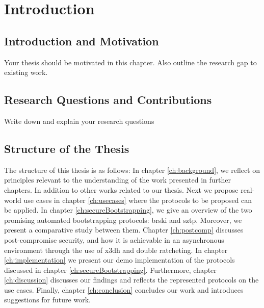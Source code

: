 \chapter{Introduction}
\label{ch:introduction}

% 


\section{Introduction and Motivation}

Your thesis should be motivated in this chapter. Also outline the research gap to existing work. 


\section{Research Questions and Contributions}\label{sec:reserach_questions}

Write down and explain your research questions

\section{Structure of the Thesis}\label{sec:structure_of_the_thesis}

The structure of this thesis is as follows: In chapter \ref{ch:background}, we reflect on principles relevant to the understanding of the work presented in further chapters. In addition to other works related to our thesis. 
Next we propose real-world use cases in chapter \ref{ch:usecases} where the protocols to be proposed can be applied.
In chapter \ref{ch:secureBootstrapping}, we give an overview of the two promising automated bootstrapping protocols: \gls{brski} and \gls{sztp}. Moreover, we present a comparative study between them.
Chapter \ref{ch:postcomp} discusses post-compromise security, and how it is achievable in an asynchronous environment through the use of \gls{x3dh} and double ratcheting. 
In chapter \ref{ch:implementation} we present our demo implementation of the protocols discussed in chapter \ref{ch:secureBootstrapping}.
Furthermore, chapter \ref{ch:discussion} discusses our findings and reflects the represented protocols on the use cases.
Finally, chapter \ref{ch:conclusion} concludes our work and introduces suggestions for future work.
